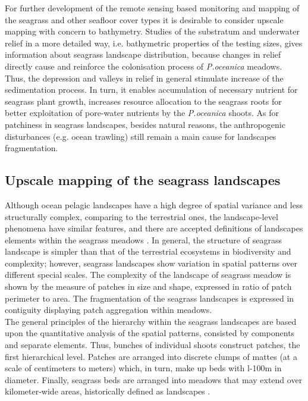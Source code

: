 \documentclass[11pt]{article}
\begin{document}
For further development of the remote sensing based monitoring and mapping of the seagrass and other seafloor cover types it is desirable to consider upscale mapping with concern to bathymetry. Studies of the substratum and underwater relief in a more detailed way, i.e. bathymetric properties of the testing sizes, gives information about seagrass landscape distribution, because changes in relief directly cause and reinforce the colonisation process of \textit{P.oceanica} meadows.  Thus, the depression and valleys in relief in general stimulate increase of the sedimentation process. In turn, it enables accumulation of necessary nutrient for seagrass plant growth, increases resource allocation to the seagrass roots for better exploitation of pore-water nutrients by the \textit{P.oceanica} shoots. As for patchiness in seagrass landscapes, besides natural reasons, the anthropogenic disturbances (e.g. ocean trawling) still remain a main cause for landscapes fragmentation.

\subsection{Upscale mapping of the seagrass landscapes}\label{page-48}
Although ocean pelagic landscapes have a high degree of spatial variance and less structurally
complex, comparing to the terrestrial ones, the landscape-level phenomena have similar features, and
there are accepted definitions of landscapes elements within the seagrass meadows \cite{Robbins94}\label{Robbins94}. 
In general, the structure of seagrass landscape is simpler than that of the terrestrial
ecosystems in biodiversity and complexity; however, seagrass landscapes show variation in spatial
patterns over different special scales. The complexity of the landscape of seagrass meadow is shown by the
measure of patches in size and shape, expressed in ratio of patch perimeter to area. The fragmentation
of the seagrass landscapes is expressed in contiguity displaying patch aggregation within meadows.\\
The general principles of the hierarchy within the seagrass landscapes are based upon the quantitative
analysis of the spatial patterns, consisted by components and separate elements. Thus, bunches of
individual shoots construct patches, the first hierarchical level. Patches are arranged into discrete
clumps of mattes (at a scale of centimeters to meters) which, in turn, make up beds with l-100m in
diameter. Finally, seagrass beds are arranged into meadows that may extend over kilometer-wide
areas, historically defined as landscapes \cite{Robbins94}\label{Robbins94}.
\end{document}
